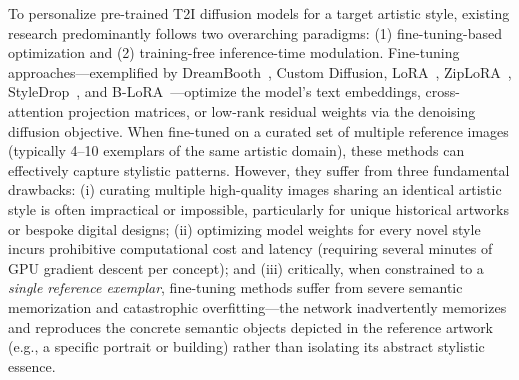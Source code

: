 To personalize pre-trained T2I diffusion models for a target artistic style, existing research predominantly follows two overarching paradigms: (1) fine-tuning-based optimization and (2) training-free inference-time modulation. Fine-tuning approaches---exemplified by DreamBooth~\cite{dreambooth}, Custom Diffusion, LoRA~\cite{lora}, ZipLoRA~\cite{ziplora}, StyleDrop~\cite{styledrop}, and B-LoRA~\cite{b-lora}---optimize the model's text embeddings, cross-attention projection matrices, or low-rank residual weights via the denoising diffusion objective. When fine-tuned on a curated set of multiple reference images (typically 4--10 exemplars of the same artistic domain), these methods can effectively capture stylistic patterns. However, they suffer from three fundamental drawbacks:
(i) curating multiple high-quality images sharing an identical artistic style is often impractical or impossible, particularly for unique historical artworks or bespoke digital designs;
(ii) optimizing model weights for every novel style incurs prohibitive computational cost and latency (requiring several minutes of GPU gradient descent per concept); and
(iii) critically, when constrained to a \textit{single reference exemplar}, fine-tuning methods suffer from severe semantic memorization and catastrophic overfitting---the network inadvertently memorizes and reproduces the concrete semantic objects depicted in the reference artwork (e.g., a specific portrait or building) rather than isolating its abstract stylistic essence.

